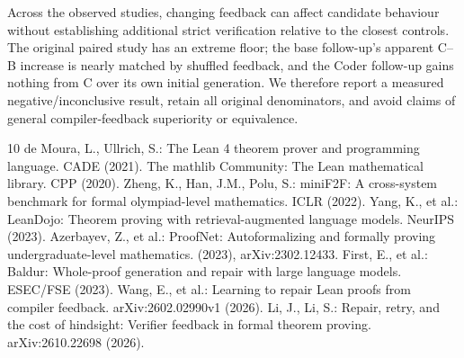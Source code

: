 \documentclass[runningheads,a4paper]{llncs}
\begin{document}
Across the observed studies, changing feedback can affect candidate
behaviour without establishing additional strict verification relative
to the closest controls. The original paired study has an extreme floor;
the base follow-up's apparent C--B increase is nearly matched by
shuffled feedback, and the Coder follow-up gains nothing from C over
its own initial generation. We therefore report a measured
negative/inconclusive result, retain all original denominators, and
avoid claims of general compiler-feedback superiority or equivalence.

\begin{thebibliography}{10}\small
{} de Moura, L., Ullrich, S.: The Lean 4 theorem prover and programming language. CADE (2021).
 The mathlib Community: The Lean mathematical library. CPP (2020).
 Zheng, K., Han, J.M., Polu, S.: miniF2F: A cross-system benchmark for formal olympiad-level mathematics. ICLR (2022).
 Yang, K., et al.: LeanDojo: Theorem proving with retrieval-augmented language models. NeurIPS (2023).
 Azerbayev, Z., et al.: ProofNet: Autoformalizing and formally proving undergraduate-level mathematics. (2023), arXiv:2302.12433.
 First, E., et al.: Baldur: Whole-proof generation and repair with large language models. ESEC/FSE (2023).
 Wang, E., et al.: Learning to repair Lean proofs from compiler feedback. arXiv:2602.02990v1 (2026).
 Li, J., Li, S.: Repair, retry, and the cost of hindsight: Verifier feedback in formal theorem proving. arXiv:2610.22698 (2026).
\end{thebibliography}
\end{document}
